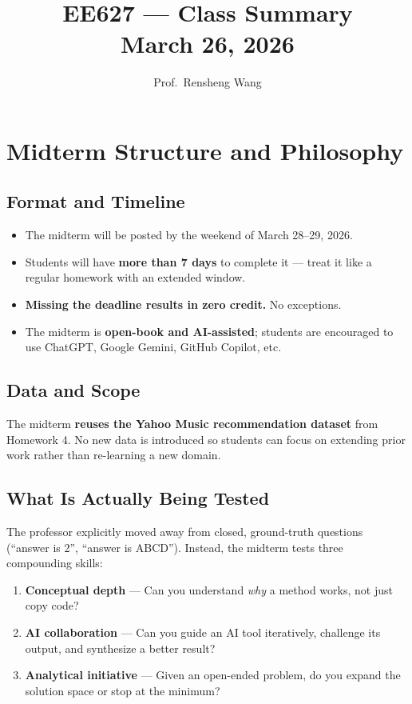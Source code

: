 \documentclass[11pt]{article}
\title{\textbf{EE627 --- Class Summary}\\[0.4em]
       \large March 26, 2026}
\author{Prof.\ Rensheng Wang}
\date{}
\begin{document}
\maketitle
\tableofcontents
\newpage

\section{Midterm Structure and Philosophy}

\subsection{Format and Timeline}
\begin{itemize}
    \item The midterm will be posted by the weekend of March 28--29, 2026.
    \item Students will have \textbf{more than 7 days} to complete it --- treat it like a regular homework with an extended window.
    \item \textbf{Missing the deadline results in zero credit.} No exceptions.
    \item The midterm is \textbf{open-book and AI-assisted}; students are encouraged to use ChatGPT, Google Gemini, GitHub Copilot, etc.
\end{itemize}

\subsection{Data and Scope}
The midterm \textbf{reuses the Yahoo Music recommendation dataset} from Homework 4.
No new data is introduced so students can focus on extending prior work rather than re-learning a new domain.

\subsection{What Is Actually Being Tested}
The professor explicitly moved away from closed, ground-truth questions (``answer is 2'', ``answer is ABCD'').
Instead, the midterm tests three compounding skills:

\begin{enumerate}
    \item \textbf{Conceptual depth} --- Can you understand \emph{why} a method works, not just copy code?
    \item \textbf{AI collaboration} --- Can you guide an AI tool iteratively, challenge its output, and synthesize a better result?
    \item \textbf{Analytical initiative} --- Given an open-ended problem, do you expand the solution space or stop at the minimum?
\end{enumerate}
\end{document}
